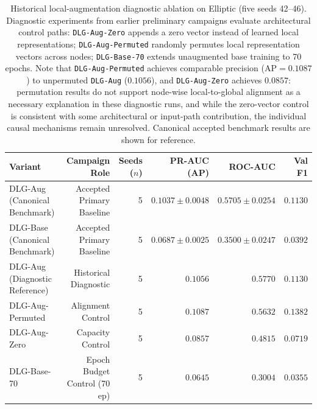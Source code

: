 \documentclass[11pt,a4paper]{article}
\begin{document}
\begin{table}[H]
\centering\footnotesize\setlength{\tabcolsep}{6pt}
\caption{Historical local-augmentation diagnostic ablation on Elliptic (five seeds 42--46). Diagnostic experiments from earlier preliminary campaigns evaluate architectural control paths: \texttt{DLG-Aug-Zero} appends a zero vector instead of learned local representations; \texttt{DLG-Aug-Permuted} randomly permutes local representation vectors across nodes; \texttt{DLG-Base-70} extends unaugmented base training to 70 epochs. Note that \texttt{DLG-Aug-Permuted} achieves comparable precision ($\mathrm{AP}=0.1087$) to unpermuted \texttt{DLG-Aug} ($0.1056$), and \texttt{DLG-Aug-Zero} achieves $0.0857$: permutation results do not support node-wise local-to-global alignment as a necessary explanation in these diagnostic runs, and while the zero-vector control is consistent with some architectural or input-path contribution, the individual causal mechanisms remain unresolved. Canonical accepted benchmark results are shown for reference.}
\label{tab:app_ablation_elliptic}
\begin{tabular}{lrrrrr}\toprule
\textbf{Variant} & \textbf{Campaign Role} & \textbf{Seeds ($n$)} & \textbf{PR-AUC (AP)} & \textbf{ROC-AUC} & \textbf{Val F1} \\\midrule
DLG-Aug (Canonical Benchmark) & Accepted Primary Baseline & 5 & $0.1037 \pm 0.0048$ & $0.5705 \pm 0.0254$ & $0.1130$ \\
DLG-Base (Canonical Benchmark) & Accepted Primary Baseline & 5 & $0.0687 \pm 0.0025$ & $0.3500 \pm 0.0247$ & $0.0392$ \\\midrule
DLG-Aug (Diagnostic Reference) & Historical Diagnostic & 5 & $0.1056$ & $0.5770$ & $0.1130$ \\
DLG-Aug-Permuted & Alignment Control & 5 & $\mathbf{0.1087}$ & $0.5632$ & $0.1382$ \\
DLG-Aug-Zero & Capacity Control & 5 & $0.0857$ & $0.4815$ & $0.0719$ \\
DLG-Base-70 & Epoch Budget Control (70 ep) & 5 & $0.0645$ & $0.3004$ & $0.0355$ \\\bottomrule
\end{tabular}
\end{table}
\end{document}
